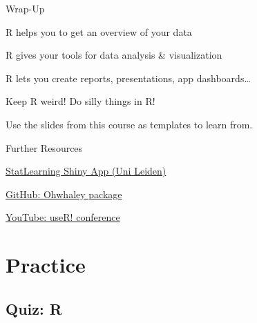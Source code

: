 \documentclass[
]{book}
\begin{document}
Wrap-Up

R helps you to get an overview of your data

R gives your tools for data analysis \& visualization

R lets you create reports, presentations, app dashboards\ldots{}

Keep R weird! Do silly things in R!

Use the slides from this course as templates to learn from.

Further Resources

\href{https://solo-fsw.shinyapps.io/NewStatLearning/}{StatLearning Shiny App (Uni Leiden)}

\href{https://github.com/fontikar/ohwhaley}{GitHub: Ohwhaley package}

\href{https://www.youtube.com/@useRConference_global}{YouTube: useR! conference}

\chapter*{Practice}\label{practice}

\section{Quiz: R}\label{quiz-r}
\end{document}
